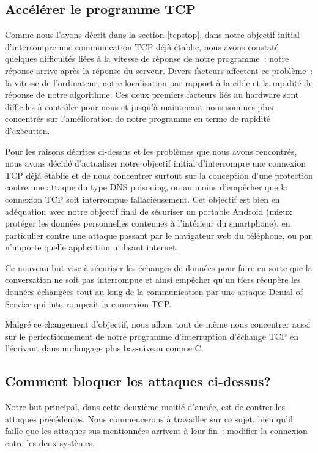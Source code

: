 \documentclass[a4paper, 12pt,twoside]{article}
\begin{document}
        \subsection{Accélérer le programme TCP}%

            Comme nous l'avons décrit dans la section \ref{tcpstop}, dans notre objectif initial d'interrompre une communication TCP déjà établie, nous avons constaté quelques difficultés liées à la vitesse de réponse de notre programme~: notre réponse arrive après la réponse du serveur. Divers facteurs affectent ce problème~: la vitesse de l'ordinateur, notre localisation par rapport à la cible et la rapidité de réponse de notre algorithme. Ces deux premiers facteurs liés au hardware sont difficiles à contrôler pour nous et jusqu'à maintenant nous sommes plus concentrés sur l'amélioration de notre programme en terme de rapidité d'exécution.

            Pour les raisons décrites ci-dessus et les problèmes que nous avons rencontrés, nous avons décidé d'actualiser notre objectif initial d'interrompre une connexion TCP déjà établie et de nous concentrer surtout sur la conception d'une protection contre une attaque du type DNS poisoning, ou au moins d'empêcher que la connexion TCP soit interrompue fallacieusement. Cet objectif est bien en adéquation avec notre objectif final de sécuriser un portable Android (mieux protéger les données personnelles contenues à l'intérieur du smartphone), en particulier contre une attaque passant par le navigateur web du téléphone, ou par n'importe quelle application utilisant internet.

            Ce nouveau but vise à sécuriser les échanges de données pour faire en sorte que la conversation ne soit pas interrompue et ainsi empêcher qu'un tiers récupère les données échangées tout au long de la communication par une attaque Denial of Service qui interromprait la connexion TCP.

            Malgré ce changement d'objectif, nous allons tout de même nous concentrer aussi sur le perfectionnement de notre programme d'interruption d'échange TCP en l'écrivant dans un langage plus bas-niveau comme C.

        \subsection{Comment bloquer les attaques ci-dessus?}

            Notre but principal, dans cette deuxième moitié d'année, est de contrer les attaques précédentes. Nous commencerons à travailler sur ce sujet, bien qu'il faille que les attaques sus-mentionnées arrivent à leur fin~: modifier la connexion entre les deux systèmes.
\end{document}
